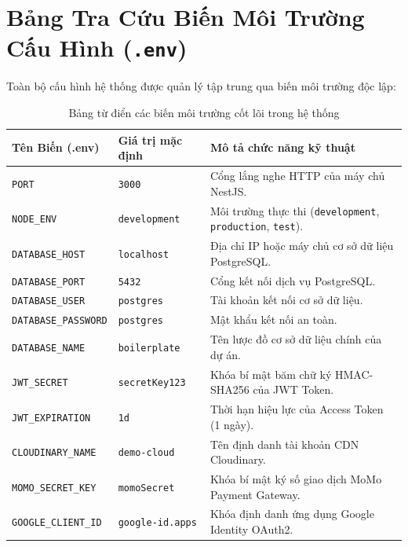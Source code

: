 \documentclass[12pt,a4paper,oneside]{book}
\begin{document}
\section{Bảng Tra Cứu Biến Môi Trường Cấu Hình (\texttt{.env})}
Toàn bộ cấu hình hệ thống được quản lý tập trung qua biến môi trường độc lập:

\begin{table}[htbp]
  \centering
  \small
  \caption{Bảng từ điển các biến môi trường cốt lõi trong hệ thống}
  \label{tab:env-variables}
  \begin{tabularx}{\textwidth}{p{3.8cm} p{2.8cm} X}
    \toprule
    \textbf{Tên Biến (.env)} & \textbf{Giá trị mặc định} & \textbf{Mô tả chức năng kỹ thuật} \\
    \midrule
    \texttt{PORT} & \texttt{3000} & Cổng lắng nghe HTTP của máy chủ NestJS. \\
    \texttt{NODE\_ENV} & \texttt{development} & Môi trường thực thi (\texttt{development}, \texttt{production}, \texttt{test}). \\
    \texttt{DATABASE\_HOST} & \texttt{localhost} & Địa chỉ IP hoặc máy chủ cơ sở dữ liệu PostgreSQL. \\
    \texttt{DATABASE\_PORT} & \texttt{5432} & Cổng kết nối dịch vụ PostgreSQL. \\
    \texttt{DATABASE\_USER} & \texttt{postgres} & Tài khoản kết nối cơ sở dữ liệu. \\
    \texttt{DATABASE\_PASSWORD} & \texttt{postgres} & Mật khẩu kết nối an toàn. \\
    \texttt{DATABASE\_NAME} & \texttt{boilerplate} & Tên lược đồ cơ sở dữ liệu chính của dự án. \\
    \texttt{JWT\_SECRET} & \texttt{secretKey123} & Khóa bí mật băm chữ ký HMAC-SHA256 của JWT Token. \\
    \texttt{JWT\_EXPIRATION} & \texttt{1d} & Thời hạn hiệu lực của Access Token (1 ngày). \\
    \texttt{CLOUDINARY\_NAME} & \texttt{demo-cloud} & Tên định danh tài khoản CDN Cloudinary. \\
    \texttt{MOMO\_SECRET\_KEY} & \texttt{momoSecret} & Khóa bí mật ký số giao dịch MoMo Payment Gateway. \\
    \texttt{GOOGLE\_CLIENT\_ID} & \texttt{google-id.apps} & Khóa định danh ứng dụng Google Identity OAuth2. \\
    \bottomrule
  \end{tabularx}
\end{table}
\end{document}
